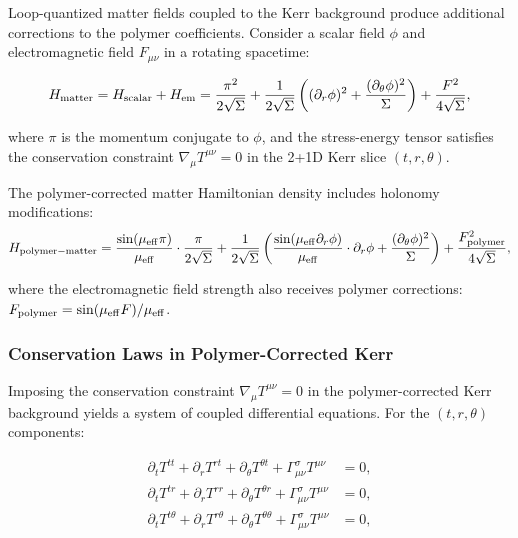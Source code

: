 \documentclass[11pt]{article}
\begin{document}
Loop-quantized matter fields coupled to the Kerr background produce additional corrections to the polymer coefficients. Consider a scalar field $\phi$ and electromagnetic field $F_{\mu\nu}$ in a rotating spacetime:

\begin{equation}
H_{\rm matter} = H_{\rm scalar} + H_{\rm em} = \frac{\pi^2}{2\sqrt{\Sigma}} + \frac{1}{2\sqrt{\Sigma}}\left((\partial_r\phi)^2 + \frac{(\partial_\theta\phi)^2}{\Sigma}\right) + \frac{F^2}{4\sqrt{\Sigma}},
\end{equation}

where $\pi$ is the momentum conjugate to $\phi$, and the stress-energy tensor satisfies the conservation constraint $\nabla_\mu T^{\mu\nu} = 0$ in the 2+1D Kerr slice $(t,r,\theta)$.

The polymer-corrected matter Hamiltonian density includes holonomy modifications:
\begin{equation}
H_{\rm polymer-matter} = \frac{\sin(\mu_{\rm eff} \pi)}{\mu_{\rm eff}} \cdot \frac{\pi}{2\sqrt{\Sigma}} + \frac{1}{2\sqrt{\Sigma}}\left(\frac{\sin(\mu_{\rm eff} \partial_r\phi)}{\mu_{\rm eff}} \cdot \partial_r\phi + \frac{(\partial_\theta\phi)^2}{\Sigma}\right) + \frac{F^2_{\rm polymer}}{4\sqrt{\Sigma}},
\end{equation}

where the electromagnetic field strength also receives polymer corrections: $F_{\rm polymer} = \sin(\mu_{\rm eff} F)/\mu_{\rm eff}$.

\subsubsection{Conservation Laws in Polymer-Corrected Kerr}

Imposing the conservation constraint $\nabla_\mu T^{\mu\nu} = 0$ in the polymer-corrected Kerr background yields a system of coupled differential equations. For the $(t,r,\theta)$ components:

\begin{align}
\partial_t T^{tt} + \partial_r T^{rt} + \partial_\theta T^{\theta t} + \Gamma_{\mu\nu}^\sigma T^{\mu\nu} &= 0, \\
\partial_t T^{tr} + \partial_r T^{rr} + \partial_\theta T^{\theta r} + \Gamma_{\mu\nu}^\sigma T^{\mu\nu} &= 0, \\
\partial_t T^{t\theta} + \partial_r T^{r\theta} + \partial_\theta T^{\theta\theta} + \Gamma_{\mu\nu}^\sigma T^{\mu\nu} &= 0,
\end{align}
\end{document}

